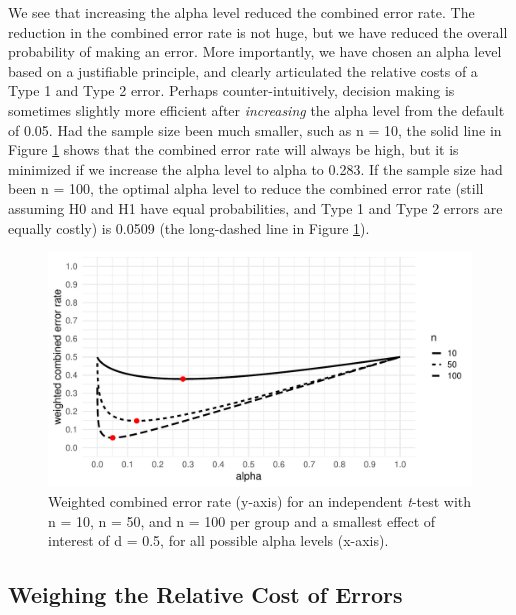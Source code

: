 \documentclass[
  english,
  ,jou, a4paper,floatsintext]{apa6}
\begin{document}
We see that increasing the alpha level reduced the combined error rate. The reduction in the combined error rate is not huge, but we have reduced the overall probability of making an error. More importantly, we have chosen an alpha level based on a justifiable principle, and clearly articulated the relative costs of a Type 1 and Type 2 error. Perhaps counter-intuitively, decision making is sometimes slightly more efficient after \emph{increasing} the alpha level from the default of 0.05. Had the sample size been much smaller, such as n = 10, the solid line in Figure \ref{fig:weight-plot} shows that the combined error rate will always be high, but it is minimized if we increase the alpha level to alpha to 0.283. If the sample size had been n = 100, the optimal alpha level to reduce the combined error rate (still assuming H0 and H1 have equal probabilities, and Type 1 and Type 2 errors are equally costly) is 0.0509 (the long-dashed line in Figure \ref{fig:weight-plot}).

\begin{figure}
\centering
\includegraphics{Justify_in_Practice_files/figure-latex/weight-plot-1.pdf}
\caption{\label{fig:weight-plot}Weighted combined error rate (y-axis) for an independent \emph{t}-test with n = 10, n = 50, and n = 100 per group and a smallest effect of interest of d = 0.5, for all possible alpha levels (x-axis).}
\end{figure}

\hypertarget{weighing-the-relative-cost-of-errors}{%
\subsection{Weighing the Relative Cost of Errors}\label{weighing-the-relative-cost-of-errors}}
\end{document}
